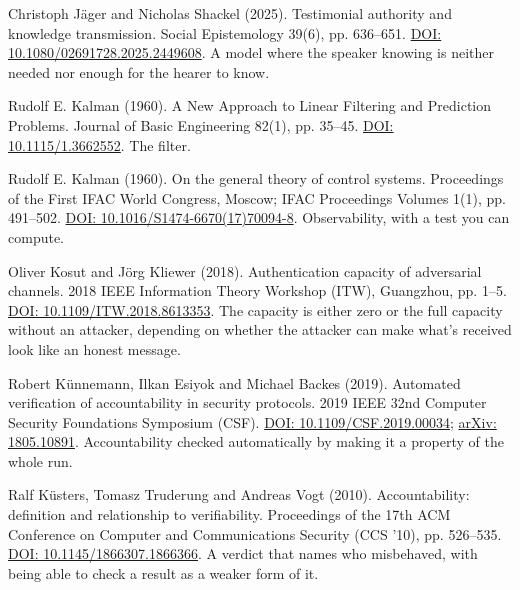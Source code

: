\documentclass[11pt,twoside]{article}
\theoremstyle{thielethm}
\theoremstyle{thieledef}
\theoremstyle{thieledef}
\theoremstyle{thieledef}
\theoremstyle{thielethm}
\theoremstyle{thieleobs}
\theoremstyle{thielethm}
\begin{document}
\noindent Christoph J\"ager and Nicholas Shackel (2025). Testimonial authority and knowledge transmission. Social Epistemology 39(6), pp. 636--651. \href{https://doi.org/10.1080/02691728.2025.2449608}{DOI: 10.1080/02691728.2025.2449608}. A model where the speaker knowing is neither needed nor enough for the hearer to know.
\par\medskip

\noindent Rudolf E. Kalman (1960). A New Approach to Linear Filtering and Prediction Problems. Journal of Basic Engineering 82(1), pp. 35--45. \href{https://doi.org/10.1115/1.3662552}{DOI: 10.1115/1.3662552}. The filter.
\par\medskip

\noindent Rudolf E. Kalman (1960). On the general theory of control systems. Proceedings of the First IFAC World Congress, Moscow; IFAC Proceedings Volumes 1(1), pp. 491--502. \href{https://doi.org/10.1016/S1474-6670(17)70094-8}{DOI: 10.1016/S1474-6670(17)70094-8}. Observability, with a test you can compute.
\par\medskip

\noindent Oliver Kosut and J\"org Kliewer (2018). Authentication capacity of adversarial channels. 2018 IEEE Information Theory Workshop (ITW), Guangzhou, pp. 1--5. \href{https://doi.org/10.1109/ITW.2018.8613353}{DOI: 10.1109/ITW.2018.8613353}. The capacity is either zero or the full capacity without an attacker, depending on whether the attacker can make what's received look like an honest message.
\par\medskip

\noindent Robert K\"unnemann, Ilkan Esiyok and Michael Backes (2019). Automated verification of accountability in security protocols. 2019 IEEE 32nd Computer Security Foundations Symposium (CSF). \href{https://doi.org/10.1109/CSF.2019.00034}{DOI: 10.1109/CSF.2019.00034}; \href{https://arxiv.org/abs/1805.10891}{arXiv: 1805.10891}. Accountability checked automatically by making it a property of the whole run.
\par\medskip

\noindent Ralf K\"usters, Tomasz Truderung and Andreas Vogt (2010). Accountability: definition and relationship to verifiability. Proceedings of the 17th ACM Conference on Computer and Communications Security (CCS '10), pp. 526--535. \href{https://doi.org/10.1145/1866307.1866366}{DOI: 10.1145/1866307.1866366}. A verdict that names who misbehaved, with being able to check a result as a weaker form of it.
\par\medskip
\end{document}
